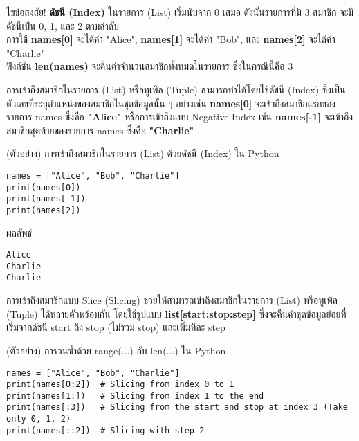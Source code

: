 \documentclass[12pt,a4paper]{article}
\newcommand{\textlight}[1]{{\thailightfont #1}}
\begin{document}
\begin{answerbox}{ไขข้อสงสัย!}
\textlight{\textbf{ดัชนี (Index)} ในรายการ (List) เริ่มนับจาก 0 เสมอ ดังนั้นรายการที่มี 3 สมาชิก จะมีดัชนีเป็น 0, 1, และ 2 ตามลำดับ \\[0.3cm] การใช้ \textbf{names[0]} จะได้ค่า "Alice", \textbf{names[1]} จะได้ค่า "Bob", และ \textbf{names[2]} จะได้ค่า "Charlie" \\[0.3cm] ฟังก์ชัน \textbf{len(names)} จะคืนค่าจำนวนสมาชิกทั้งหมดในรายการ ซึ่งในกรณีนี้คือ 3}
\end{answerbox}

\vspace{3cm}

\textlight{การเข้าถึงสมาชิกในรายการ (List) หรือทูเพิล (Tuple) สามารถทำได้โดยใช้ดัชนี (Index) ซึ่งเป็นตัวเลขที่ระบุตำแหน่งของสมาชิกในชุดข้อมูลนั้น ๆ อย่างเช่น \textbf{names[0]} จะเข้าถึงสมาชิกแรกของรายการ names ซึ่งคือ \textbf{"Alice"} หรือการเข้าถึงแบบ Negative Index เช่น \textbf{names[-1]} จะเข้าถึงสมาชิกสุดท้ายของรายการ names ซึ่งคือ \textbf{"Charlie"}}

\begin{codebox}{(ตัวอย่าง) การเข้าถึงสมาชิกในรายการ (List) ด้วยดัชนี (Index) ใน Python}
\begin{lstlisting}[style=python]
names = ["Alice", "Bob", "Charlie"]
print(names[0])
print(names[-1])
print(names[2])
\end{lstlisting}
\end{codebox}

\begin{resultbox}{ผลลัพธ์}
\begin{verbatim}
Alice
Charlie
Charlie
\end{verbatim}
\end{resultbox}

\vspace{0.5cm}

\textlight{การเข้าถึงสมาชิกแบบ Slice (Slicing) ช่วยให้สามารถเข้าถึงสมาชิกในรายการ (List) หรือทูเพิล (Tuple) ได้หลายตัวพร้อมกัน โดยใช้รูปแบบ \textbf{list[start:stop:step]} ซึ่งจะคืนค่าชุดข้อมูลย่อยที่เริ่มจากดัชนี start ถึง stop (ไม่รวม stop) และเพิ่มทีละ step}

\begin{codebox}{(ตัวอย่าง) การวนซ้ำด้วย range(...) กับ len(...) ใน Python}
\begin{lstlisting}[style=python]
names = ["Alice", "Bob", "Charlie"]
print(names[0:2])  # Slicing from index 0 to 1
print(names[1:])   # Slicing from index 1 to the end
print(names[:3])   # Slicing from the start and stop at index 3 (Take only 0, 1, 2)
print(names[::2])  # Slicing with step 2
\end{lstlisting}
\end{codebox}
\end{document}
